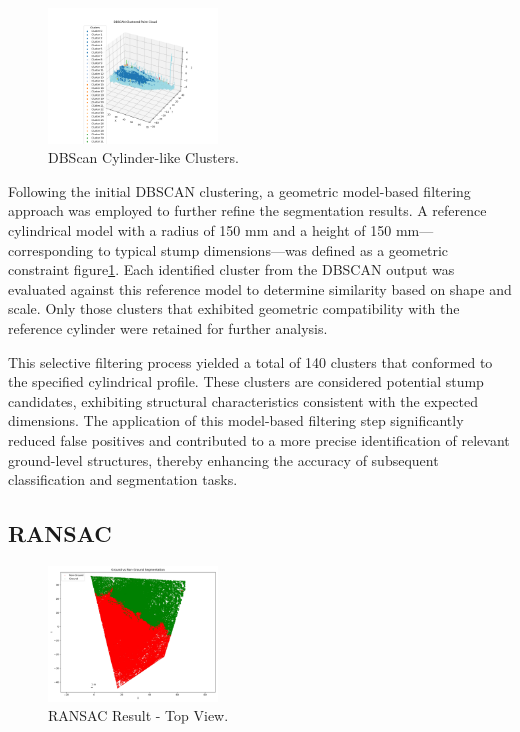 \documentclass[../report.tex]{subfiles}
\begin{document}
    \begin{figure}[H]
        \centering
        \includegraphics[width=0.4\textwidth]{rnd-project-report-main/figures/Clustering_2_filtered_point_cloud_with labels.png}
        \caption{DBScan Cylinder-like Clusters.}
        \label{fig:dbscan_cylinder}
    \end{figure}
    Following the initial DBSCAN clustering, a geometric model-based filtering approach was employed to further refine the segmentation results. A reference cylindrical model with a radius of 150 mm and a height of 150 mm—corresponding to typical stump dimensions—was defined as a geometric constraint figure\ref{fig:dbscan_cylinder}. Each identified cluster from the DBSCAN output was evaluated against this reference model to determine similarity based on shape and scale. Only those clusters that exhibited geometric compatibility with the reference cylinder were retained for further analysis.

    This selective filtering process yielded a total of 140 clusters that conformed to the specified cylindrical profile. These clusters are considered potential stump candidates, exhibiting structural characteristics consistent with the expected dimensions. The application of this model-based filtering step significantly reduced false positives and contributed to a more precise identification of relevant ground-level structures, thereby enhancing the accuracy of subsequent classification and segmentation tasks.

    \subsection{RANSAC}
    \begin{figure}[H]
        \centering
        \includegraphics[width=0.4\textwidth]{rnd-project-report-main/figures/ground_non_ground_with_legend.jpg}
        \caption{RANSAC Result - Top View.}
        \label{fig:RANSAC_result}
    \end{figure}
    
\end{document}

